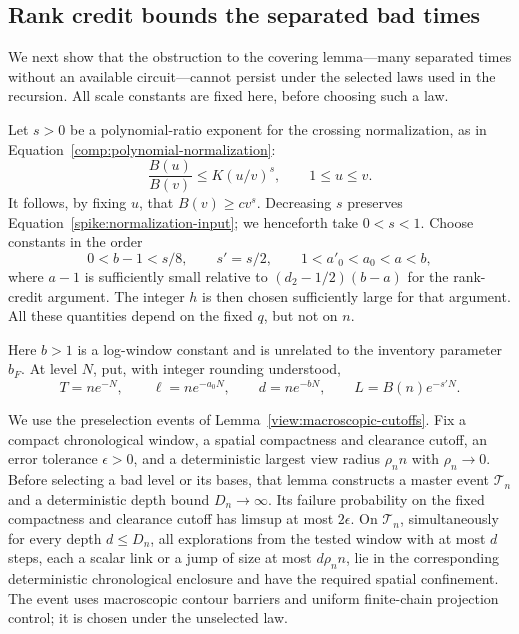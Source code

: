 \subsection{Rank credit bounds the separated bad times}

We next show that the obstruction to the covering lemma---many separated
times without an available circuit---cannot persist under the selected
laws used in the recursion.  All scale constants are fixed here, before
choosing such a law.

Let $s>0$ be a polynomial-ratio exponent for the crossing normalization,
as in Equation~\eqref{comp:polynomial-normalization}:
\begin{equation}\label{spike:normalization-input}
 \frac{B(u)}{B(v)}\le K(u/v)^s,\qquad 1\le u\le v.
\end{equation}
It follows, by fixing $u$, that $B(v)\ge c v^s$.  Decreasing $s$ preserves
Equation~\eqref{spike:normalization-input}; we henceforth take $0<s<1$.
Choose constants in the order
\begin{equation}\label{spike:parameter-order}
 0<b-1<s/8,\qquad s'=s/2,\qquad
 1<a'_0<a_0<a<b,
\end{equation}
where $a-1$ is sufficiently small relative to
$(d_2-1/2)(b-a)$ for the rank-credit argument.  The integer $h$ is then
chosen sufficiently large for that argument.  All these quantities
depend on the fixed $q$, but not on $n$.

Here $b>1$ is a log-window constant and is unrelated to the inventory
parameter $b_F$.  At level $N$, put, with integer rounding understood,
\begin{equation}\label{spike:scales}
 T=n e^{-N},\qquad \ell=n e^{-a_0N},\qquad
 d=n e^{-bN},\qquad L=B(n)e^{-s'N}.
\end{equation}

We use the preselection events of Lemma~\ref{view:macroscopic-cutoffs}.
Fix a compact chronological window, a spatial compactness and clearance
cutoff, an error tolerance $\epsilon>0$, and a deterministic largest
view radius $\rho_n n$ with $\rho_n\to0$.  Before selecting a bad level
or its bases, that lemma constructs a master event $\mathcal T_n$ and
a deterministic depth bound $D_n\to\infty$.  Its failure probability
on the fixed compactness and clearance cutoff has limsup at most
$2\epsilon$.  On $\mathcal T_n$, simultaneously for every depth
$d\le D_n$, all explorations from the tested window with at most $d$
steps, each a scalar link or a jump of size at most $d\rho_n n$, lie in the
corresponding
deterministic chronological enclosure and have the required spatial
confinement.  The event uses macroscopic contour barriers and uniform
finite-chain projection control; it is chosen under the unselected law.

